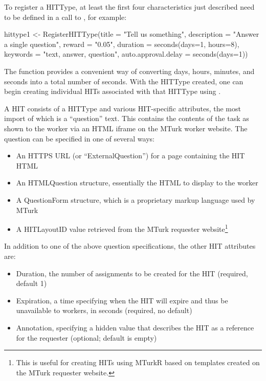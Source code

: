 To register a HITType, at least the first four characteristics just described need to be defined in a call to , for example:

\begin{example}
hittype1 <- RegisterHITType(title = "Tell us something", 
                            description = "Answer a single question", 
                            reward = "0.05", 
                            duration = seconds(days=1, hours=8), 
                            keywords = "text, answer, question", 
                            auto.approval.delay = seconds(days=1))
\end{example}

The  function provides a convenient way of converting days, hours, minutes, and seconds into a total number of seconds. With the HITType created, one can begin creating individual HITs associated with that HITType using .

A HIT consists of a HITType and various HIT-specific attributes, the most import of which is a ``question'' text. This contains the contents of the task as shown to the worker via an HTML iframe on the MTurk worker website. The question can be specified in one of several ways:

\begin{itemize}
	\item An HTTPS URL (or ``ExternalQuestion'') for a page containing the HIT HTML
	\item An HTMLQuestion structure, essentially the HTML to display to the worker
	\item A QuestionForm structure, which is a proprietary markup language used by MTurk
	\item A HITLayoutID value retrieved from the MTurk requester website\footnote{This is useful for creating HITs using MTurkR based on templates created on the MTurk requester website.}
\end{itemize}

\noindent In addition to one of the above question specifications, the other HIT attributes are:

\begin{itemize}
\item Duration, the number of assignments to be created for the HIT (required, default 1)
\item Expiration, a time specifying when the HIT will expire and thus be unavailable to workers, in seconds (required, no default)
\item Annotation, specifying a hidden value that describes the HIT as a reference for the requester (optional; default is empty)
\end{itemize}

